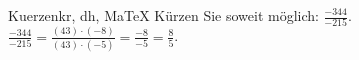 \begin{MAufgabe}{Kuerzen}{kr, dh, MaTeX}
K\"urzen Sie soweit m\"oglich: $\frac{-344}{-215}$.\\ 
\ifLsg\MLoesung
\quad $\frac{-344}{-215}=\frac{(43)\cdot(-8)}{(43)\cdot(-5)}=\frac{-8}{-5}=\frac{8}{5}$.\else\relax\fi
 \end{MAufgabe}